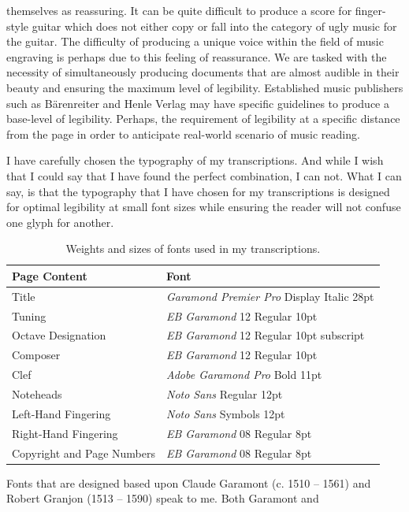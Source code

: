 \documentclass[nofonts,nobib]{tufte-handout}
\newcommand{\textls}[2][5]{%
    \begingroup\addfontfeatures{LetterSpace=#1}#2\endgroup
  }
\renewcommand{\smallcapsspacing}[1]{\textls[10]{#1}}
\renewcommand{\textsc}[1]{\smallcapsspacing{\textsmallcaps{#1}}}
\begin{document}
  themselves as reassuring. It can be quite difficult to produce a
  score for finger-style guitar which does not either copy
  \textsc{sel} or fall into the category of ugly music for the
  guitar. The difficulty of producing a unique voice within the field
  of music engraving is perhaps due to this feeling of reassurance. We
  are tasked with the necessity of simultaneously producing documents
  that are almost audible in their beauty and ensuring the maximum
  level of legibility. Established music publishers such as
  Bärenreiter and Henle Verlag may have specific guidelines to produce
  a base-level of legibility. Perhaps, the requirement of legibility
  at a specific distance from the page in order to anticipate
  real-world scenario of music reading.

  I have carefully chosen the typography of my transcriptions. And
  while I wish that I could say that I have found the perfect
  combination, I can not. What I can say, is that the typography that
  I have chosen for my transcriptions is designed for optimal
  legibility at small font sizes while ensuring the reader will not
  confuse one glyph for another.
  \begin{table}\centering
    \small
    \begin{tabular}{l l}\toprule
      Page Content  & Font \\\midrule
      Title & \emph{Garamond Premier Pro} Display Italic 28pt\\
      Tuning & \emph{EB Garamond} 12 Regular 10pt\\
      Octave Designation & \emph{EB Garamond} 12 Regular 10pt subscript\\
      Composer & \emph{EB Garamond} 12 Regular 10pt\\
      Clef & \emph{Adobe Garamond Pro} Bold 11pt\\
      Noteheads & \emph{Noto Sans} Regular 12pt\\
      Left-Hand Fingering & \emph{Noto Sans} Symbols 12pt\\
      Right-Hand Fingering & \emph{EB Garamond} 08 Regular 8pt\\
      Copyright and Page Numbers & \emph{EB Garamond} 08 Regular 8pt\\
      \bottomrule
  \end{tabular}
    \caption{Weights and sizes of fonts used in my transcriptions.}
\end{table}
Fonts that are designed based upon Claude Garamont (c. 1510 -- 1561)
and Robert Granjon (1513 -- 1590) speak to me. Both Garamont and
\end{document}
